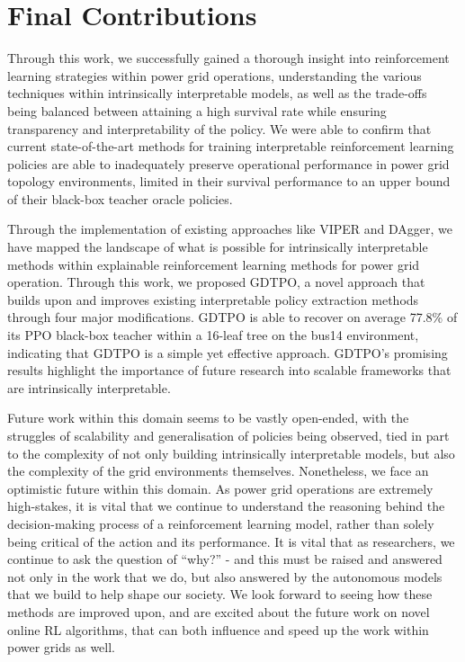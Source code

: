 \section{Final Contributions}

Through this work, we successfully gained a thorough insight into reinforcement learning strategies within power grid operations, understanding the various techniques within intrinsically interpretable models, as well as the trade-offs being balanced between attaining a high survival rate while ensuring transparency and interpretability of the policy. 
We were able to confirm that current state-of-the-art methods for training interpretable reinforcement learning policies are able to inadequately preserve operational performance in power grid topology environments, limited in their survival performance to an upper bound of their black-box teacher oracle policies.

Through the implementation of existing approaches like VIPER and DAgger, we have mapped the landscape of what is possible for intrinsically interpretable methods within explainable reinforcement learning methods for power grid operation. Through this work, we proposed GDTPO, a novel approach that builds upon and improves existing interpretable policy extraction methods through four major modifications. GDTPO is able to recover on average 77.8\% of its PPO black-box teacher within a 16-leaf tree on the bus14 environment, indicating that GDTPO is a simple yet effective approach. GDTPO's promising results highlight the importance of future research into scalable frameworks that are intrinsically interpretable.

Future work within this domain seems to be vastly open-ended, with the struggles of scalability and generalisation of policies being observed, tied in part to the complexity of not only building intrinsically interpretable models, but also the complexity of the grid environments themselves. Nonetheless, we face an optimistic future within this domain. As power grid operations are extremely high-stakes, it is vital that we continue to understand the reasoning behind the decision-making process of a reinforcement learning model, rather than solely being critical of the action and its performance. It is vital that as researchers, we continue to ask the question of ``why?'' - and this must be raised and answered not only in the work that we do, but also answered by the autonomous models that we build to help shape our society. We look forward to seeing how these methods are improved upon, and are excited about the future work on novel online RL algorithms, that can both influence and speed up the work within power grids as well.



